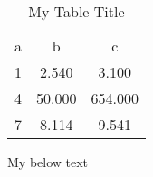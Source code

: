 \begin{table}
\centering
\begin{threeparttable}
\caption{My Table Title}
\begin{tabular}{@{}l!{}c@{}c@{}}
\toprule
a & b & c\\
1 &  2.540 &   3.100 \\
4 & 50.000 & 654.000 \\
7 &  8.114 &   9.541 \\
\bottomrule

\end{tabular}
\begin{tablenotes}
My below text
\end{tablenotes}
\end{threeparttable}
\end{table}